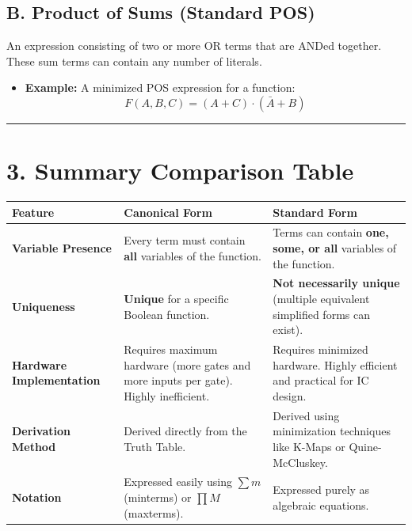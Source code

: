 \documentclass[12pt,a3paper]{article}
\begin{document}
\begin{enumerate}
\begin{tcolorbox}[enhanced,breakable,ansbox,colback=cB!4,colframe=cB,boxrule=0.8pt,arc=5pt,title={\textbf{Answer}},fonttitle=\bfseries\color{white},colbacktitle=cB]
\subsection*{B. Product of Sums (Standard POS)}
An expression consisting of two or more OR terms that are ANDed together. These sum terms can contain any number of literals.
\begin{itemize}
    \item \textbf{Example:} A minimized POS expression for a function:
    \begin{equation*}
        F(A, B, C) = (A + C) \cdot (\bar{A} + B)
    \end{equation*}
\end{itemize}

\vspace{0.2cm}
\hrule
\vspace{0.4cm}

\section*{3. Summary Comparison Table}

\begin{center}
\renewcommand{\arraystretch}{1.5}
\begin{tabular}{p{4cm} p{5.5cm} p{5.5cm}}
    \toprule
    \textbf{Feature} & \textbf{\textcolor{cB}{Canonical Form}} & \textbf{\textcolor{cB}{Standard Form}} \\
    \midrule
    \textbf{Variable Presence} & Every term must contain \textbf{all} variables of the function. & Terms can contain \textbf{one, some, or all} variables of the function. \\
    \textbf{Uniqueness} & \textbf{Unique} for a specific Boolean function. & \textbf{Not necessarily unique} (multiple equivalent simplified forms can exist). \\
    \textbf{Hardware Implementation} & Requires maximum hardware (more gates and more inputs per gate). Highly inefficient. & Requires minimized hardware. Highly efficient and practical for IC design. \\
    \textbf{Derivation Method} & Derived directly from the Truth Table. & Derived using minimization techniques like K-Maps or Quine-McCluskey. \\
    \textbf{Notation} & Expressed easily using $\sum m$ (minterms) or $\prod M$ (maxterms). & Expressed purely as algebraic equations. \\
    \bottomrule
\end{tabular}
\end{center}


\end{tcolorbox}
\end{enumerate}
\end{document}
